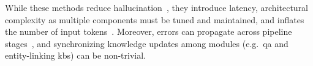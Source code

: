 


While these methods reduce hallucination~\cite{shuster-etal-2021-retrieval-augmentation}, they introduce latency,  architectural complexity as multiple components must be tuned and maintained, and inflates the number of input tokens~\cite{yang2024memory3,zhou2025openragoptimizingragendtoend}. Moreover, errors can propagate across pipeline stages~\cite{le-fokkens-2017-tackling}, and synchronizing knowledge updates among modules (e.g.\ \ac{qa} and entity-linking \acp{kb}) can be non-trivial.

